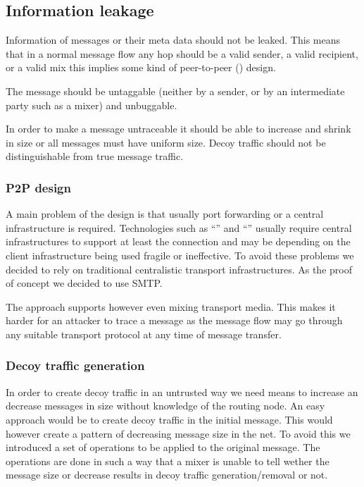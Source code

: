 \subsection{Information leakage}
Information of messages or their meta data should not be leaked. This means that in a normal message flow any hop should be a valid sender, a valid recipient, or a valid mix this implies some kind of peer-to-peer () design. 

The message should be untaggable (neither by a sender, or by an intermediate party such as a mixer) and unbuggable. 

In order to make a message untraceable it should be able to increase and shrink in size or all messages must have uniform size. Decoy traffic should not be distinguishable from true message traffic. 

\subsubsection{P2P design}
A main problem of the  design is that usually port forwarding or a central infrastructure is required. Technologies such as ``'' and ``'' usually require central infrastructures to support at least the connection and may be depending on the client infrastructure being used fragile or ineffective. To avoid these problems we decided to rely on traditional centralistic transport infrastructures. As the proof of concept we decided to use SMTP. 

The approach supports however even mixing transport media. This makes it harder for an attacker to trace a message as the message flow may go through any suitable transport protocol at any time of message transfer.

\subsubsection{Decoy traffic generation}
In order to create decoy traffic in an untrusted way we need means to increase an decrease messages in size without knowledge of the routing node. An easy approach would be to create decoy traffic in the initial message. This would however create a pattern of decreasing message size in the net. To avoid this we introduced a set of operations to be applied to the original message. The operations are done in such a way that a mixer is unable to tell wether the message size or decrease results in decoy traffic generation/removal or not.

